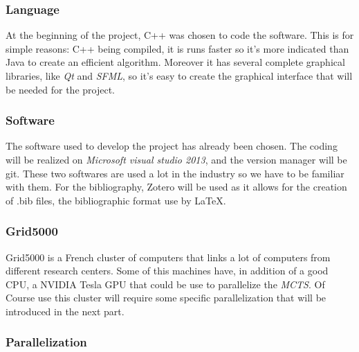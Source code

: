 \subsubsection{Language}

At the beginning of the project, C++ was chosen to code the software. This is for simple reasons: C++ being compiled, it is runs faster so it's more indicated than Java to create an efficient algorithm.  Moreover it has several complete graphical libraries, like \emph{Qt} and \emph{SFML}, so it's easy to create the graphical interface that will be needed for the project.

\subsubsection{Software}

The software used to develop the project has already been chosen. The coding will be realized on \emph{Microsoft visual studio 2013}, and the version manager will be git. These two softwares are used a lot in the industry so we have to be familiar with them.
For the bibliography, Zotero will be used as it allows for the creation of .bib files, the bibliographic format use by LaTeX.

\subsubsection{Grid5000}

Grid5000 is a French cluster of computers that links a lot of computers from different research centers. Some of this machines have, in addition of a good CPU, a NVIDIA Tesla GPU that could be use to parallelize the \emph{MCTS}. Of Course use this cluster will require some specific parallelization that will be introduced in the next part.

\subsubsection{Parallelization}

